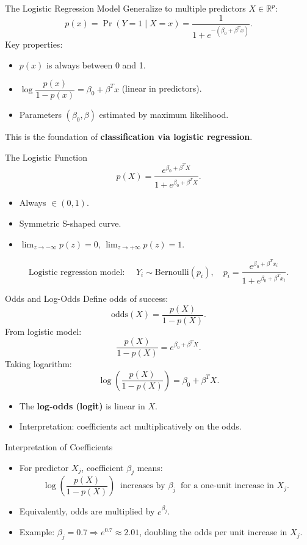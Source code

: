 \documentclass[../../main.tex]{subfiles}
\begin{document}
\begin{frame}{The Logistic Regression Model}
Generalize to multiple predictors $X \in \mathbb{R}^p$:
\[
p(x) = \Pr(Y=1 \mid X=x) = \frac{1}{1 + e^{-(\beta_0 + \beta^T x)}}.
\]
Key properties:
\begin{itemize}
    \item $p(x)$ is always between 0 and 1.  
    \item $\log \dfrac{p(x)}{1-p(x)} = \beta_0 + \beta^T x$ (linear in predictors).  
    \item Parameters $(\beta_0, \beta)$ estimated by maximum likelihood.  
\end{itemize}
This is the foundation of \textbf{classification via logistic regression}.
\end{frame}



\begin{frame}{The Logistic Function}
\[
p(X) = \frac{e^{\beta_0 + \beta^T X}}{1 + e^{\beta_0 + \beta^T X}}.
\]
\begin{itemize}
    \item Always $\in (0,1)$.  
    \item Symmetric S-shaped curve.  
    \item $\lim_{z\to -\infty} p(z)=0$, $\lim_{z\to +\infty} p(z)=1$.  
\end{itemize}
\[
\text{Logistic regression model: } \quad Y_i \sim \text{Bernoulli}(p_i), \quad 
p_i = \frac{e^{\beta_0 + \beta^T x_i}}{1 + e^{\beta_0 + \beta^T x_i}}.
\]
\end{frame}

\begin{frame}{Odds and Log-Odds}
Define odds of success:
\[
\text{odds}(X) = \frac{p(X)}{1 - p(X)}.
\]
From logistic model:
\[
\frac{p(X)}{1 - p(X)} = e^{\beta_0 + \beta^T X}.
\]
Taking logarithm:
\[
\log\left(\frac{p(X)}{1 - p(X)}\right) = \beta_0 + \beta^T X.
\]
\begin{itemize}
    \item The \textbf{log-odds (logit)} is linear in $X$.  
    \item Interpretation: coefficients act multiplicatively on the odds.  
\end{itemize}
\end{frame}

\begin{frame}{Interpretation of Coefficients}
\begin{itemize}
    \item For predictor $X_j$, coefficient $\beta_j$ means:
    \[
    \log\left(\frac{p(X)}{1 - p(X)}\right) \;\; \text{increases by } \beta_j \;\; \text{for a one-unit increase in } X_j.
    \]
    \item Equivalently, odds are multiplied by $e^{\beta_j}$.  
    \item Example: $\beta_j = 0.7 \Rightarrow e^{0.7} \approx 2.01$, doubling the odds per unit increase in $X_j$.  
\end{itemize}
\end{frame}
\end{document}
